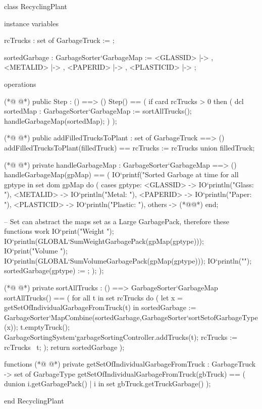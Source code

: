 \begin{vdmpp}[breaklines=true]
class RecyclingPlant

instance variables

rcTrucks : set of GarbageTruck := {};

sortedGarbage : GarbageSorter`GarbageMap := {   <GLASSID>   |-> {},
                                                <METALID>   |-> {},
                                                <PAPERID>   |-> {},
                                                <PLASTICID> |-> {}
                                            };


operations

(*@
\label{Step:16}
@*)
public Step : () ==> ()
Step() == (
    if card rcTrucks > 0 then
    (
        dcl sortedMap : GarbageSorter`GarbageMap := sortAllTrucks();
            handleGarbageMap(sortedMap);
    )
);

(*@
\label{addFilledTrucksToPlant:25}
@*)
public addFilledTrucksToPlant : set of GarbageTruck ==> ()
addFilledTrucksToPlant(filledTruck) == 
    rcTrucks := rcTrucks union filledTruck;

(*@
\label{handleGarbageMap:29}
@*)
private handleGarbageMap : GarbageSorter`GarbageMap ==> ()
handleGarbageMap(gpMap) ==
(
    IO`printf("Sorted Garbage at time %
    for all gptype in set dom gpMap do
    (
        cases gptype:
            <GLASSID> -> IO`println("Glass: "),
            <METALID> -> IO`println("Metal: "),
            <PAPERID> -> IO`println("Paper: "),
            <PLASTICID> -> IO`println("Plastic: "),
            others -> (*@@*)
        end;

        -- Set can abstract the maps set as a Large GarbagePack, therefore these functions work
        IO`print("Weight ");
        IO`println(GLOBAL`SumWeightGarbagePack(gpMap(gptype)));
        IO`print("Volume ");
        IO`println(GLOBAL`SumVolumeGarbagePack(gpMap(gptype)));
        IO`println("");
        sortedGarbage(gptype) := {};
    );
);

(*@
\label{sortAllTrucks:53}
@*)
private sortAllTrucks : () ==> GarbageSorter`GarbageMap
sortAllTrucks() == (
    for all t in set rcTrucks
        do 
        (
            let x = getSetOfIndividualGarbageFromTruck(t) in
                sortedGarbage := GarbageSorter`MapCombine(sortedGarbage,GarbageSorter`sortSetofGarbageType(x));
            t.emptyTruck();
            GarbageSortingSystem`garbageSortingController.addTrucks({t});
            rcTrucks := rcTrucks \ {t};
        );
    return sortedGarbage 
);


functions
(*@
\label{getSetOfIndividualGarbageFromTruck:69}
@*)
private getSetOfIndividualGarbageFromTruck : GarbageTruck -> set of GarbageType
getSetOfIndividualGarbageFromTruck(gbTruck) == (
    dunion {i.getGarbagePack() | i in set gbTruck.getTruckGarbage()}
);


end RecyclingPlant
\end{vdmpp}

